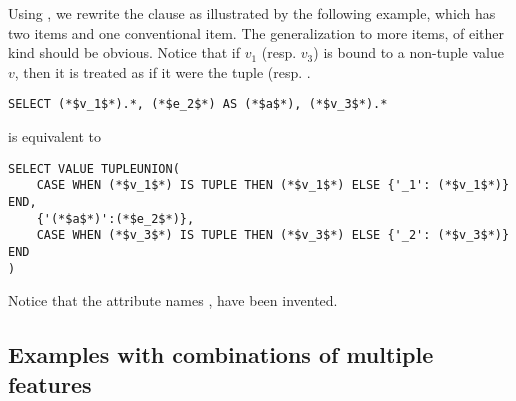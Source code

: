 Using \tupleunion, we rewrite the \select clause as illustrated by the following
example, which has two  items and one conventional item. The
generalization to more items, of either kind should be obvious. Notice that if
$v_1$ (resp. $v_3$) is bound to a non-tuple value $v$, then it is treated as if
it were the tuple  (resp. . 

\begin{lstlisting}
SELECT (*$v_1$*).*, (*$e_2$*) AS (*$a$*), (*$v_3$*).*
\end{lstlisting}

\noindent is equivalent to

\begin{lstlisting}
SELECT VALUE TUPLEUNION(
    CASE WHEN (*$v_1$*) IS TUPLE THEN (*$v_1$*) ELSE {'_1': (*$v_1$*)} END,
    {'(*$a$*)':(*$e_2$*)},
    CASE WHEN (*$v_3$*) IS TUPLE THEN (*$v_3$*) ELSE {'_2': (*$v_3$*)} END
)
\end{lstlisting}

Notice that the attribute names ,  have been invented.


\subsection{Examples with combinations of multiple features}

